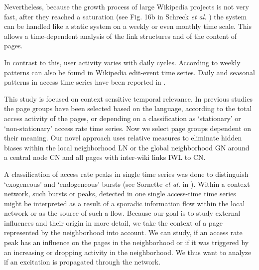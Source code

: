\documentclass[a4paper,10pt]{scrbook}
\begin{document}
Nevertheless, because the growth process of large Wikipedia projects is
not very fast, after they reached a saturation (see Fig. 16b in Schreck \textit{et al.} \cite{Schreck.2013b}) the system can be handled like a static system on a weekly or even monthly time scale. This allows a time-dependent analysis of the link
structures and of the content of pages.

In contrast to this, user activity varies with daily cycles. According to
\cite{10.1371/journal.pone.0030091} weekly patterns can also be found in Wikipedia
edit-event time series. Daily and seasonal patterns in access time series
have been reported in \cite{Schreck.2013b}.

This study is focused on context sensitive temporal relevance. In previous
studies the page groups have been selected based on the language,
according to the total access activity of the pages, or depending on a
classification as  `stationary' or `non-stationary' access rate
time series. Now we select page groups dependent on their meaning. Our novel approach 
uses relative measures to eliminate hidden biases within the
local neighborhood LN or the global neighborhood GN around a central node CN
and all pages with inter-wiki links IWL to CN.

A classification of access rate peaks in single time series was done to
distinguish `exogeneous' and `endogeneous' bursts (see Sornette
\textit{et al.} in \cite{Sornette.2008, PHYSA.2012}). Within a context network,
such bursts or peaks, detected in one single access-time time series might be
interpreted as a result of a sporadic information flow within the local network
or as the source of such a flow. Because our goal is to study external influences and
their origin in more detail, we take the context of a page represented by
the neighborhood into account. We can study, if an access rate peak has an
influence on the pages in the neighborhood or if it was triggered by an
increasing or dropping activity in the neighborhood. We thus want to
analyze if an excitation is propagated through the network.
\end{document}
